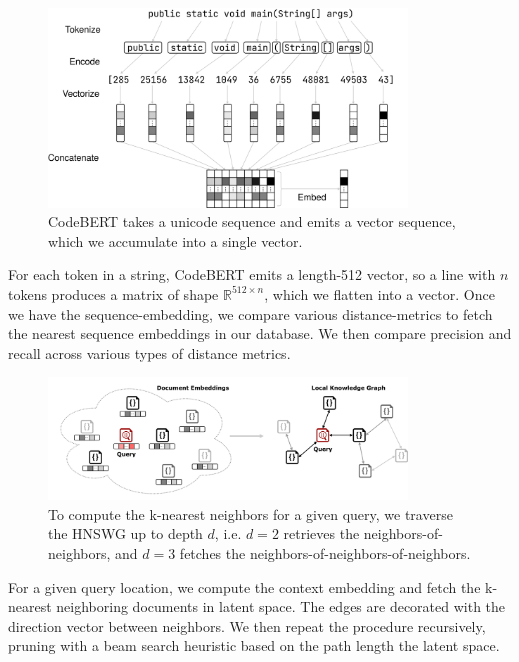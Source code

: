 \documentclass[11pt]{article}
\begin{document}
\begin{figure}[H]
  \centering
  \includegraphics[width=0.85\textwidth]{bert_embedding}
  \caption{CodeBERT takes a unicode sequence and emits a vector sequence, which we accumulate into a single vector.}
\end{figure}

For each token in a string, CodeBERT emits a length-512 vector, so a line with $n$ tokens produces a matrix of shape $\mathbb R^{512\times n}$, which we flatten into a vector. Once we have the sequence-embedding, we compare various distance-metrics to fetch the nearest sequence embeddings in our database. We then compare precision and recall across various types of distance metrics.

\begin{figure}[H]
  \centering
  \includegraphics[width=0.85\textwidth]{latent_kg}
  \caption{To compute the k-nearest neighbors for a given query, we traverse the HNSWG up to depth $d$, i.e. $d=2$ retrieves the neighbors-of-neighbors, and $d=3$ fetches the neighbors-of-neighbors-of-neighbors.}
\end{figure}

For a given query location, we compute the context embedding and fetch the k-nearest neighboring documents in latent space. The edges are decorated with the direction vector between neighbors. We then repeat the procedure recursively, pruning with a beam search heuristic based on the path length the latent space.
\end{document}
